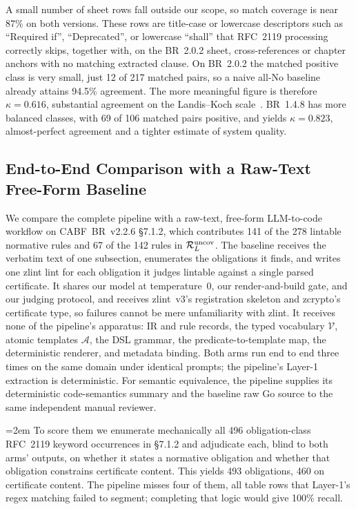 A small number of sheet rows fall outside our scope, so match coverage is near
87\% on both versions. These rows are title-case or lowercase descriptors such as
``Required if'', ``Deprecated'', or lowercase ``shall'' that RFC~2119 processing
correctly skips, together with, on the BR~2.0.2 sheet, cross-references or chapter
anchors with no matching extracted clause. On BR~2.0.2 the matched positive class is
very small, just 12 of 217 matched pairs, so a naive all-No baseline
already attains 94.5\% agreement. The more meaningful figure is therefore
$\kappa = 0.616$, substantial agreement on the Landis--Koch
scale~\cite{landis1977measurement}. BR~1.4.8 has more balanced classes, with 69
of 106 matched pairs positive, and yields $\kappa = 0.823$,
almost-perfect agreement and a tighter estimate of system quality.

\subsection{End-to-End Comparison with a Raw-Text Free-Form Baseline}
\label{subsec:baseline}

We compare the complete pipeline with a raw-text, free-form LLM-to-code workflow
on CABF~BR~v2.2.6 \S7.1.2, which contributes 141 of the 278 lintable normative
rules and 67 of the 142 rules in $\mathcal{R}_L^{\mathrm{uncov}}$. The baseline receives the verbatim text
of one subsection, enumerates the obligations it finds, and writes one zlint lint
for each obligation it judges lintable against a single parsed certificate. It
shares our model at temperature~0, our render-and-build gate, and our judging
protocol, and receives zlint~v3's registration skeleton and zcrypto's certificate
type, so failures cannot be mere unfamiliarity with zlint. It receives none of
the pipeline's apparatus: IR and rule records, the typed vocabulary $\mathcal{V}$,
atomic templates $\mathcal{A}$, the DSL grammar, the predicate-to-template map,
the deterministic renderer, and metadata binding. Both arms run end to end three
times on the same domain under identical prompts; the pipeline's Layer-1
extraction is deterministic. For semantic equivalence, the pipeline supplies its
deterministic code-semantics summary and the baseline raw Go source to the same
independent manual reviewer.

\begingroup\emergencystretch=2em\relax
To score them we enumerate mechanically all 496 obligation-class RFC~2119 keyword
occurrences in \S7.1.2 and adjudicate each, blind to both arms' outputs, on
whether it states a normative obligation and whether that obligation constrains
certificate content. This yields 493 obligations, 460 on certificate content. The
pipeline misses four of them, all table rows that Layer-1's regex matching failed
to segment; completing that logic would give 100\% recall.
\par\endgroup


